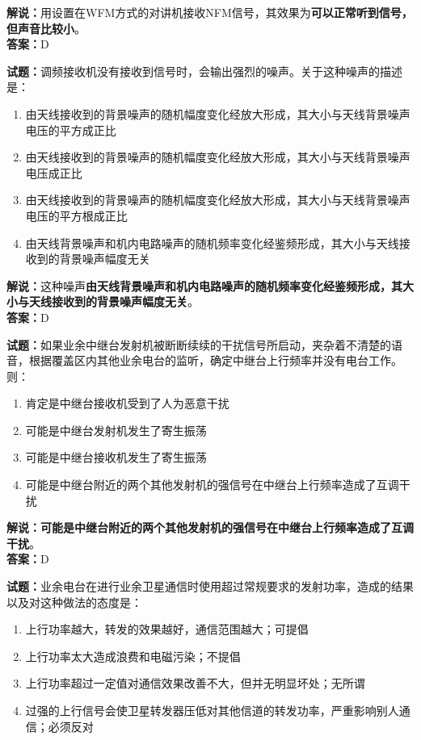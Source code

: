\documentclass{ctexbook}
\begin{document}
\noindent\textbf{解说：}用设置在WFM方式的对讲机接收NFM信号，其效果为\textbf{可以正常听到信号，但声音比较小}。\\\noindent\textbf{答案：}D

\bigskip


\noindent\textbf{试题：}调频接收机没有接收到信号时，会输出强烈的噪声。关于这种噪声的描述是：

\begin{enumerate}[leftmargin=3em]
	\item 由天线接收到的背景噪声的随机幅度变化经放大形成，其大小与天线背景噪声电压的平方成正比
	\item 由天线接收到的背景噪声的随机幅度变化经放大形成，其大小与天线背景噪声电压成正比
	\item 由天线接收到的背景噪声的随机幅度变化经放大形成，其大小与天线背景噪声电压的平方根成正比
	\item 由天线背景噪声和机内电路噪声的随机频率变化经鉴频形成，其大小与天线接收到的背景噪声幅度无关
\end{enumerate}

\noindent\textbf{解说：}这种噪声\textbf{由天线背景噪声和机内电路噪声的随机频率变化经鉴频形成，其大小与天线接收到的背景噪声幅度无关}。\\\noindent\textbf{答案：}D%

\bigskip


\noindent\textbf{试题：}如果业余中继台发射机被断断续续的干扰信号所启动，夹杂着不清楚的语音，根据覆盖区内其他业余电台的监听，确定中继台上行频率并没有电台工作。则：

\begin{enumerate}[leftmargin=3em]
	\item 肯定是中继台接收机受到了人为恶意干扰
	\item 可能是中继台发射机发生了寄生振荡
	\item 可能是中继台接收机发生了寄生振荡
	\item 可能是中继台附近的两个其他发射机的强信号在中继台上行频率造成了互调干扰
\end{enumerate}

\noindent\textbf{解说：可能是中继台附近的两个其他发射机的强信号在中继台上行频率造成了互调干扰}。\\\noindent\textbf{答案：}D%


\bigskip


\noindent\textbf{试题：}业余电台在进行业余卫星通信时使用超过常规要求的发射功率，造成的结果以及对这种做法的态度是：

\begin{enumerate}[leftmargin=3em]
	\item 上行功率越大，转发的效果越好，通信范围越大；可提倡
	\item 上行功率太大造成浪费和电磁污染；不提倡
	\item 上行功率超过一定值对通信效果改善不大，但并无明显坏处；无所谓
	\item 过强的上行信号会使卫星转发器压低对其他信道的转发功率，严重影响别人通信；必须反对
\end{enumerate}
\end{document}

